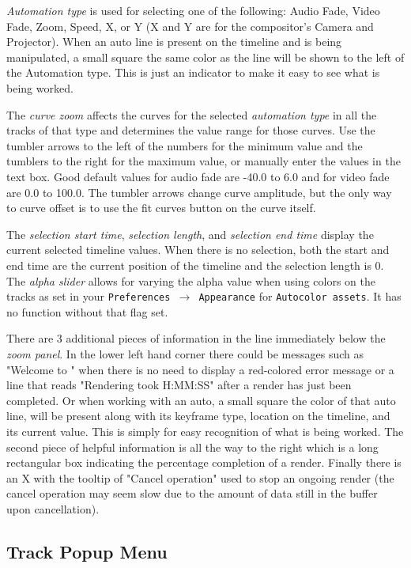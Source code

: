 \emph{Automation type} is used for selecting one of the following: Audio Fade, Video Fade, Zoom, Speed, X, or Y (X and Y are for the compositor's Camera and Projector).  When an auto line is present on
the timeline and is being manipulated, a small square the same color as the line will be shown to 
the left of the Automation type.  This is just an indicator to make it easy to see what is being worked.
 
The \emph{curve zoom} affects the curves for the selected \emph{automation type} in all the tracks of that type and determines the value range for those curves. 
Use the tumbler arrows to the left of the numbers for the minimum value and the tumblers to the right for the maximum value, or manually enter the values in the text box. 
Good default values for audio fade are -40.0 to 6.0 and for video fade are 0.0 to 100.0. 
The tumbler arrows change curve amplitude, but the only way to curve offset is to use the fit curves button on the curve itself.

The \emph{selection start time}, \emph{selection length}, and \emph{selection end time} display the current selected timeline values. When there is no selection, both the start and end time are the current
position of the timeline and the selection length is 0.
The \emph{alpha slider} allows for varying the alpha value when using colors on the tracks as set in your \texttt{Preferences $\rightarrow$ Appearance} for \texttt{Autocolor assets}.  
It has no function without that flag set.

There are 3 additional pieces of information in the line immediately below the \textit{zoom panel}.
In the lower left hand corner there could be messages such as "Welcome to \CGG{}" when there is no 
need to display a red-colored error message or a line that reads "Rendering took H:MM:SS" after a render
has just been completed. Or when working with an auto, a small square the color of that auto line, will be
present along with its keyframe type, location on the timeline, and its current value.  This is simply
for easy recognition of what is being worked. The second piece of helpful information is all the way to
the right which is a long rectangular box indicating the percentage completion of a render. Finally
there is an X with the tooltip of "Cancel operation" used to stop an ongoing render
(the cancel operation may seem slow due to the amount of data still in the buffer upon cancellation).

\subsection{Track Popup Menu}%
\label{sub:track_popup_menu}

